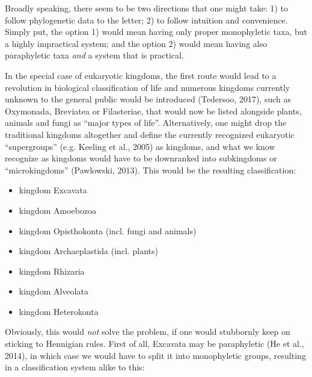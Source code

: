 \begin{artengenv}
Broadly speaking, there seem to be two directions that one might take: 1) to follow phylogenetic data to the letter; 2)
to follow intuition and convenience. Simply put, the option 1) would mean having only proper monophyletic taxa, but a
highly impractical system; and the option 2) would mean having also paraphyletic taxa \textit{and} a system that is
practical.

In the special case of eukaryotic kingdoms, the first route would lead to a revolution in biological classification of
life and numerous kingdoms currently unknown to the general public would be introduced
\label{ref:RND3uML7k6B2X}(Tedersoo, 2017), such as Oxymonada, Breviatea or Filasteriae, that would now be listed
alongside plants, animals and fungi as “major types of life”. Alternatively, one might drop the traditional kingdoms
altogether and define the currently recognized eukaryotic “supergroups” \label{ref:RNDsc7VI9vP7w}(e.g. Keeling et al.,
2005) as kingdoms, and what we know recognize as kingdoms would have to be downranked into subkingdoms or
“microkingdoms” \label{ref:RNDAlF3xlGnxL}(Pawlowski, 2013). This would be the resulting classification:

\begin{itemize}
\item kingdom Excavata
\item kingdom Amoebozoa
\item kingdom Opisthokonta (incl. fungi and animals)
\item kingdom Archaeplastida (incl. plants)
\item kingdom Rhizaria
\item kingdom Alveolata
\item kingdom Heterokonta
\end{itemize}
Obviously, this would \textit{not} solve the problem, if one would stubbornly keep on sticking to Hennigian rules. First
of all, Excavata may be paraphyletic \label{ref:RNDd85mwMFAal}(He et al., 2014), in which case we would have to split
it into monophyletic groups, resulting in a classification system alike to this:


\end{artengenv}
